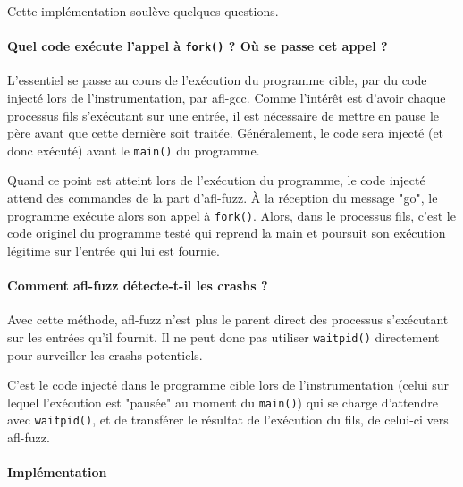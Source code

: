 Cette implémentation soulève quelques questions.

\paragraph{Quel code exécute l'appel à \lstinline{fork()} ? Où se passe cet appel ?}

L'essentiel se passe au cours de l'exécution du programme cible, par du code injecté lors de l'instrumentation, par afl-gcc.
Comme l'intérêt est d'avoir chaque processus fils s'exécutant sur une entrée, il est nécessaire de mettre en pause le père avant que cette dernière soit traitée.
Généralement, le code sera injecté (et donc exécuté) avant le \lstinline{main()} du programme.

Quand ce point est atteint lors de l'exécution du programme, le code injecté attend des commandes de la part d'afl-fuzz.
À la réception du message "go", le programme exécute alors son appel à \lstinline{fork()}.
Alors, dans le processus fils, c'est le code originel du programme testé qui reprend la main et poursuit son exécution légitime sur l'entrée qui lui est fournie.


\paragraph{Comment afl-fuzz détecte-t-il les crashs ?}

Avec cette méthode, afl-fuzz n'est plus le parent direct des processus s'exécutant sur les entrées qu'il fournit.
Il ne peut donc pas utiliser \lstinline{waitpid()} directement pour surveiller les crashs potentiels.

C'est le code injecté dans le programme cible lors de l'instrumentation (celui sur lequel l'exécution est "pausée" au moment du \lstinline{main()}) qui se charge d'attendre avec \lstinline{waitpid()}, et de transférer le résultat de l'exécution du fils, de celui-ci vers afl-fuzz.

\paragraph{Implémentation}

